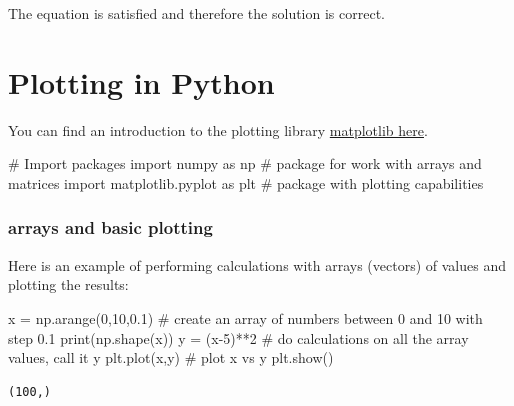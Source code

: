 \documentclass[
  letterpaper,
  DIV=11,
  numbers=noendperiod]{scrreprt}
\newenvironment{Shaded}{\begin{snugshade}}{\end{snugshade}}
\newcommand{\BuiltInTok}[1]{\textcolor[rgb]{0.00,0.23,0.31}{#1}}
\newcommand{\CommentTok}[1]{\textcolor[rgb]{0.37,0.37,0.37}{#1}}
\newcommand{\DecValTok}[1]{\textcolor[rgb]{0.68,0.00,0.00}{#1}}
\newcommand{\FloatTok}[1]{\textcolor[rgb]{0.68,0.00,0.00}{#1}}
\newcommand{\ImportTok}[1]{\textcolor[rgb]{0.00,0.46,0.62}{#1}}
\newcommand{\NormalTok}[1]{\textcolor[rgb]{0.00,0.23,0.31}{#1}}
\newcommand{\OperatorTok}[1]{\textcolor[rgb]{0.37,0.37,0.37}{#1}}
\begin{document}
The equation is satisfied and therefore the solution is correct.


\hypertarget{plotting-in-python}{%
\chapter{Plotting in Python}\label{plotting-in-python}}

You can find an introduction to the plotting library
\href{https://matplotlib.org/tutorials/introductory/pyplot.html}{matplotlib
here}.

\begin{Shaded}
\begin{Highlighting}[]
\CommentTok{\# Import packages}
\ImportTok{import}\NormalTok{ numpy }\ImportTok{as}\NormalTok{ np }\CommentTok{\# package for work with arrays and matrices}
\ImportTok{import}\NormalTok{ matplotlib.pyplot }\ImportTok{as}\NormalTok{ plt }\CommentTok{\# package with plotting capabilities}
\end{Highlighting}
\end{Shaded}

\hypertarget{arrays-and-basic-plotting}{%
\subsection{arrays and basic plotting}\label{arrays-and-basic-plotting}}

Here is an example of performing calculations with arrays (vectors) of
values and plotting the results:

\begin{Shaded}
\begin{Highlighting}[]
\NormalTok{x }\OperatorTok{=}\NormalTok{ np.arange(}\DecValTok{0}\NormalTok{,}\DecValTok{10}\NormalTok{,}\FloatTok{0.1}\NormalTok{) }\CommentTok{\# create an array of numbers between 0 and 10 with step 0.1}
\BuiltInTok{print}\NormalTok{(np.shape(x))}
\NormalTok{y }\OperatorTok{=}\NormalTok{ (x}\OperatorTok{{-}}\DecValTok{5}\NormalTok{)}\OperatorTok{**}\DecValTok{2} \CommentTok{\# do calculations on all the array values, call it y}
\NormalTok{plt.plot(x,y) }\CommentTok{\# plot x vs y}
\NormalTok{plt.show()}
\end{Highlighting}
\end{Shaded}

\begin{verbatim}
(100,)
\end{verbatim}
\end{document}
